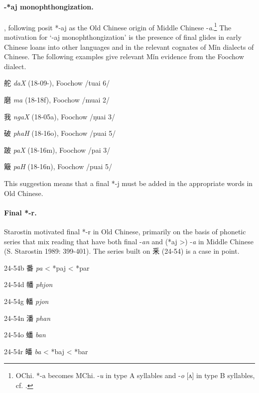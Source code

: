 \paragraph{-*aj monophthongization.}
\citet[269]{Baxter2014OldChinese}, following 
\citet[292, 413, 570-571]{Baxter1992}
posit *-aj as the Old Chinese origin of Middle Chinese
-\emph{a}.\footnote{OChi. *-a becomes MChi. -\emph{u} in type A
  syllables and -\emph{o} [ʌ] in type B syllables, cf. \cite[572, 575]{Baxter1992}.}
   The motivation for `-aj monophthongization' is the presence
of final glides in early Chinese loans into other languages and in the
relevant cognates of Mǐn dialects of Chinese. The following examples
give relevant Mǐn evidence from the Foochow dialect.

\begin{description} \item
舵  \emph{daX} (18-09-), Foochow /tuai 6/
\item
磨 \emph{ma} (18-18f), Foochow /muai 2/
\item
我 \emph{ngaX} (18-05a), Foochow /ŋuai 3/
\item
破 \emph{phaH} (18-16o), Foochow /p{}uai 5/
\item
跛 \emph{paX} (18-16m), Foochow /pai 3/
\item
簸 \emph{paH} (18-16n), Foochow /puai 5/
\end{description}

This suggestion means that a final *-j must be added in the appropriate
words in Old Chinese.

\paragraph{Final *-r.} 
\label{par:final-r}
Starostin motivated final *-r in Old Chinese, primarily on the basis
of phonetic series that mix reading that have both final -\emph{an} and
(*aj \textgreater{}) -\emph{a} in Middle Chinese (S. Starostin 1989:
399-401). The series built on 釆 (24-54) is a case in point.

\begin{description} \item
24-54b 番 \emph{pa} \textless{} *p{}aj \textless{} *p{}ar
\item
24-54d 幡 \emph{phjon}
\item
24-54g 轓 \emph{pjon}
\item
24-54n 潘 \emph{phan}
\item
24-54o 蟠 \emph{ban}
\item
24-54r 皤 \emph{ba} \textless{} *b{}aj \textless{} *b{}ar
\end{description}

